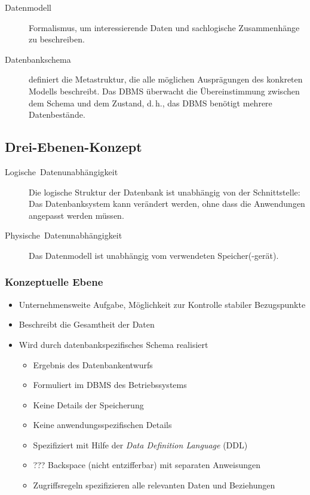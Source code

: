 \begin{description}
  \item [{Datenmodell}]
	Formalismus, um interessierende Daten und sachlogische Zusammenhänge zu beschreiben.
  \item [{Datenbankschema}]
	definiert die Metastruktur, die alle möglichen Ausprägungen des konkreten Modells beschreibt.
	Das DBMS überwacht die Übereinstimmung zwischen dem Schema und dem Zustand, d.\,h., das DBMS benötigt mehrere Datenbestände.
\end{description}

\subsection{Drei-Ebenen-Konzept}
\begin{description}
  \item [{Logische~Datenunabhängigkeit}]
	Die logische Struktur der Datenbank ist unabhängig von der Schnittstelle:
	Das Datenbanksystem kann verändert werden, ohne dass die Anwendungen angepasst werden müssen.
  \item [{Physische~Datenunabhängigkeit}]
	Das Datenmodell ist unabhängig vom verwendeten Speicher(-gerät).
\end{description}

\subsubsection{Konzeptuelle Ebene}
\begin{itemize}
  \item Unternehmensweite Aufgabe, Möglichkeit zur Kontrolle stabiler Bezugspunkte
  \item Beschreibt die Gesamtheit der Daten
  \item Wird durch datenbankspezifisches Schema realisiert
      \begin{itemize}
	\item Ergebnis des Datenbankentwurfs
	\item Formuliert im DBMS des Betriebssystems
	\item Keine Details der Speicherung
	\item Keine anwendungsspezifischen Details
	\item Spezifiziert mit Hilfe der \emph{Data Definition Language} (DDL)
	\item ??? Backspace{} (nicht entzifferbar) mit separaten Anweisungen
	\item Zugriffsregeln spezifizieren alle relevanten Daten und Beziehungen
      \end{itemize}
\end{itemize}


